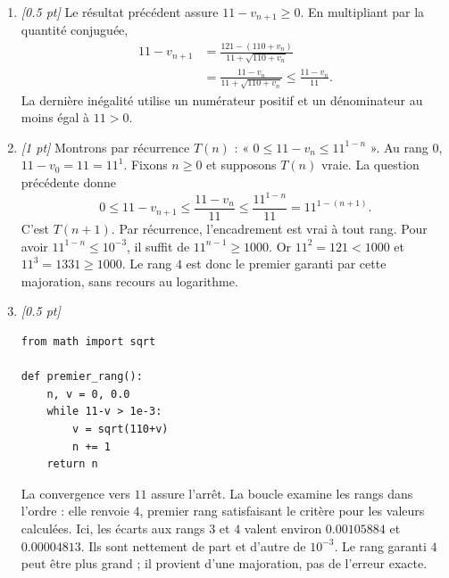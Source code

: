 \begin{enumerate}
\item \textit{[\num{0,5} pt]} Le résultat précédent assure $11-v_{n+1}\ge0$. En multipliant par la quantité conjuguée,
\[\begin{aligned}11-v_{n+1}&=\frac{121-(110+v_n)}{11+\sqrt{110+v_n}}\\&=\frac{11-v_n}{11+\sqrt{110+v_n}}\le\frac{11-v_n}{11}.\end{aligned}\]
La dernière inégalité utilise un numérateur positif et un dénominateur au moins égal à $11>0$.

\item \textit{[1 pt]} Montrons par récurrence $T(n)$ : « $0\le 11-v_n\le 11^{1-n}$ ».
Au rang $0$, $11-v_0=11=11^1$. Fixons $n\ge0$ et supposons $T(n)$ vraie. La question précédente donne
\[0\le 11-v_{n+1}\le\frac{11-v_n}{11}\le\frac{11^{1-n}}{11}=11^{1-(n+1)}.\]
C'est $T(n+1)$. Par récurrence, l'encadrement est vrai à tout rang.
Pour avoir $11^{1-n}\le10^{-3}$, il suffit de $11^{n-1}\ge1000$.
Or $11^{2}=121<1000$ et $11^{3}=1331\ge1000$. Le rang $4$ est donc le premier garanti par cette majoration, sans recours au logarithme.


\item \textit{[\num{0,5} pt]} 
\begin{lstlisting}
from math import sqrt

def premier_rang():
    n, v = 0, 0.0
    while 11-v > 1e-3:
        v = sqrt(110+v)
        n += 1
    return n
\end{lstlisting}
La convergence vers $11$ assure l'arrêt. La boucle examine les rangs dans l'ordre : elle renvoie $4$, premier rang satisfaisant le critère pour les valeurs calculées. Ici, les écarts aux rangs $3$ et $4$ valent environ $\num{0,00105884}$ et $\num{0,00004813}$. Ils sont nettement de part et d'autre de $10^{-3}$. Le rang garanti $4$ peut être plus grand ; il provient d'une majoration, pas de l'erreur exacte.

\end{enumerate}

